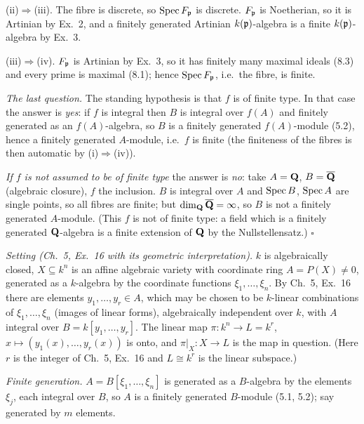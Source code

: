 \documentclass[11pt]{article}
\begin{document}
(ii)$\Rightarrow$(iii). The fibre is discrete, so $\operatorname{Spec} F_\mathfrak p$ is discrete. $F_\mathfrak p$ is Noetherian, so it is Artinian by Ex.~2, and a finitely generated Artinian $k(\mathfrak p)$-algebra is a finite $k(\mathfrak p)$-algebra by Ex.~3.

(iii)$\Rightarrow$(iv). $F_\mathfrak p$ is Artinian by Ex.~3, so it has finitely many maximal ideals (8.3) and every prime is maximal (8.1); hence $\operatorname{Spec} F_\mathfrak p$, i.e.\ the fibre, is finite.

\emph{The last question.} The standing hypothesis is that $f$ is of finite type. In that case the answer is \emph{yes}: if $f$ is integral then $B$ is integral over $f(A)$ and finitely generated as an $f(A)$-algebra, so $B$ is a finitely generated $f(A)$-module (5.2), hence a finitely generated $A$-module, i.e.\ $f$ is finite (the finiteness of the fibres is then automatic by (i)$\Rightarrow$(iv)).

\emph{If $f$ is not assumed to be of finite type} the answer is \emph{no}: take $A=\mathbf Q$, $B=\overline{\mathbf Q}$ (algebraic closure), $f$ the inclusion. $B$ is integral over $A$ and $\operatorname{Spec} B$, $\operatorname{Spec} A$ are single points, so all fibres are finite; but $\dim_\mathbf Q\overline{\mathbf Q}=\infty$, so $B$ is not a finitely generated $A$-module. (This $f$ is not of finite type: a field which is a finitely generated $\mathbf Q$-algebra is a finite extension of $\mathbf Q$ by the Nullstellensatz.) \hfill$\square$

\pf
\emph{Setting (Ch.~5, Ex.~16 with its geometric interpretation).} $k$ is algebraically closed, $X\subseteq k^n$ is an affine algebraic variety with coordinate ring $A=P(X)\ne0$, generated as a $k$-algebra by the coordinate functions $\xi_1,\dots,\xi_n$. By Ch.~5, Ex.~16 there are elements $y_1,\dots,y_r\in A$, which may be chosen to be $k$-linear combinations of $\xi_1,\dots,\xi_n$ (images of linear forms), algebraically independent over $k$, with $A$ integral over $B=k[y_1,\dots,y_r]$. The linear map $\pi:k^n\to L=k^r$, $x\mapsto(y_1(x),\dots,y_r(x))$ is onto, and $\pi|_X:X\to L$ is the map in question. (Here $r$ is the integer of Ch.~5, Ex.~16 and $L\cong k^r$ is the linear subspace.)

\emph{Finite generation.} $A=B[\xi_1,\dots,\xi_n]$ is generated as a $B$-algebra by the elements $\xi_j$, each integral over $B$, so $A$ is a finitely generated $B$-module (5.1, 5.2); say generated by $m$ elements.
\end{document}

